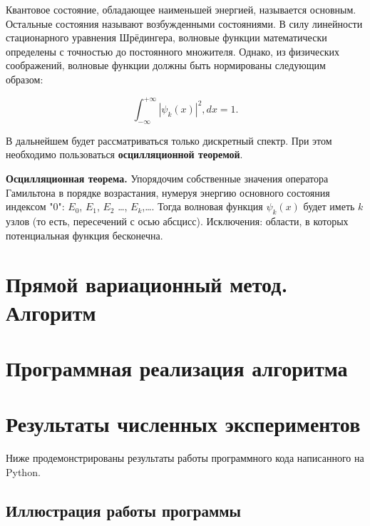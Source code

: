 \documentclass[a4paper,12pt]{article}
\begin{document}
Квантовое состояние, обладающее наименьшей энергией, называется основным.
Остальные состояния называют возбужденными состояниями.
В силу линейности стационарного уравнения Шрёдингера, волновые функции математически определены с точностью до постоянного множителя.
Однако, из физических соображений, волновые функции должны быть нормированы следующим образом:

\begin{equation}
    \int_{-\infty}^{+\infty} |\psi_k(x)|^2, dx = 1.
    \label{eq:wave_func_normalization}
\end{equation}

В дальнейшем будет рассматриваться только дискретный спектр.
При этом необходимо пользоваться \textbf{осцилляционной теоремой}.

\textbf{Осцилляционная теорема.}
Упорядочим собственные значения оператора Гамильтона в порядке возрастания, нумеруя энергию основного состояния индексом "0": $E_0$, $E_1$, $E_2$ \dots, $E_k$,\dots.
Тогда волновая функция $\psi_k(x)$ будет иметь $k$ узлов (то есть, пересечений с осью абсцисс).
Исключения: области, в которых потенциальная функция бесконечна.

\newpage

\section{Прямой вариационный метод. Алгоритм}\label{sec:solve_method}


\newpage

\section{Программная реализация алгоритма}\label{sec:--}


\newpage

\section{Результаты численных экспериментов}\label{sec:results}

Ниже продемонстрированы результаты работы программного кода написанного на Python.

\subsection{Иллюстрация работы программы}\label{subsec:results_images}
\end{document}
